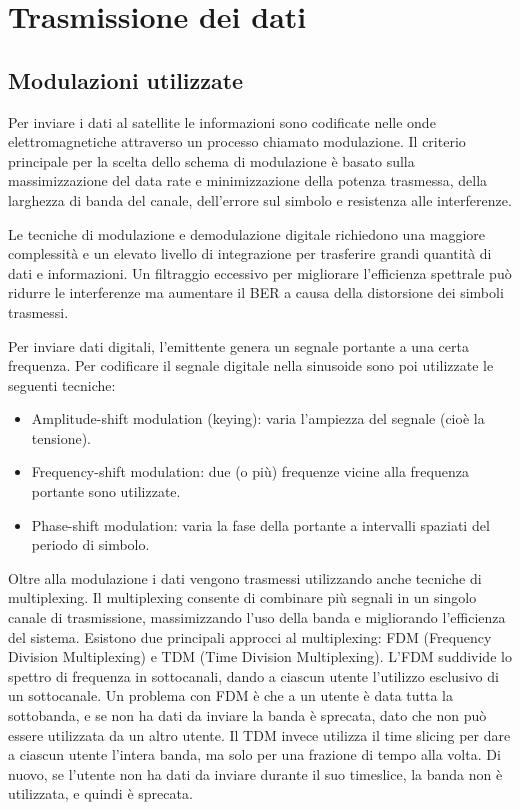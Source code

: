
\chapter{Trasmissione dei dati}
\section{Modulazioni utilizzate}
Per inviare i dati al satellite le informazioni sono codificate nelle onde elettromagnetiche attraverso un processo chiamato modulazione.
Il criterio principale per la scelta dello schema di modulazione è basato sulla massimizzazione del data rate e minimizzazione della potenza trasmessa, della larghezza di banda del canale, dell'errore sul simbolo e resistenza alle interferenze.

Le tecniche di modulazione e demodulazione digitale richiedono una maggiore complessità e un elevato livello di integrazione per trasferire grandi quantità di dati e informazioni.
Un filtraggio eccessivo per migliorare l'efficienza spettrale può ridurre le interferenze ma aumentare il \ac{BER} a causa della distorsione dei simboli trasmessi.

Per inviare dati digitali, l'emittente genera un segnale portante a una certa frequenza.
Per codificare il segnale digitale nella sinusoide sono poi utilizzate le seguenti tecniche:
\begin{itemize}
  \item Amplitude-shift modulation (keying): varia l'ampiezza del segnale (cioè la tensione).
  \item Frequency-shift modulation: due (o più) frequenze vicine alla frequenza portante sono utilizzate.
  \item Phase-shift modulation: varia la fase della portante a intervalli spaziati del periodo di simbolo.
\end{itemize}

Oltre alla modulazione i dati vengono trasmessi utilizzando anche tecniche di multiplexing.
Il multiplexing consente di combinare più segnali in un singolo canale di trasmissione, massimizzando l'uso della banda e migliorando l'efficienza del sistema.
Esistono due principali approcci al multiplexing: FDM (Frequency Division Multiplexing) e TDM (Time Division Multiplexing).
L'FDM suddivide lo spettro di frequenza in sottocanali, dando a ciascun utente l'utilizzo esclusivo di un sottocanale.
Un problema con FDM è che a un utente è data tutta la sottobanda, e se non ha dati da inviare la banda è sprecata, dato che non può essere utilizzata da un altro utente.
Il TDM invece utilizza il time slicing per dare a ciascun utente l'intera banda, ma solo per una frazione di tempo alla volta.
Di nuovo, se l'utente non ha dati da inviare durante il suo timeslice, la banda non è utilizzata, e quindi è sprecata.

